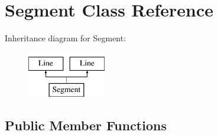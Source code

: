 \hypertarget{classSegment}{\section{Segment Class Reference}
\label{classSegment}
}
Inheritance diagram for Segment\-:\begin{figure}[H]
\begin{center}
\leavevmode
\includegraphics[height=2.000000cm]{classSegment}
\end{center}
\end{figure}
\subsection*{Public Member Functions}
